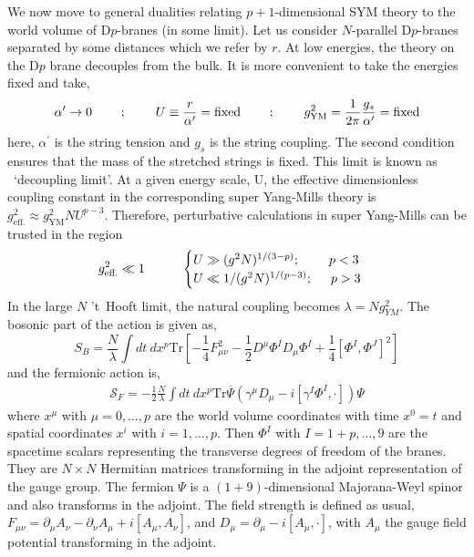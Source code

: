 We now move to general dualities relating $p+1$-dimensional SYM theory to the world volume of D$p$-branes
(in some limit). Let us consider $N$-parallel D$p$-branes separated by some distances which we 
refer by $r$. At low energies, the theory on the D$p$ brane decouples from the bulk. It is more convenient to
take the energies fixed and take, 
\[ \alpha^{\prime} \rightarrow 0  \hspace{8mm} ; \hspace{8mm} U \equiv \frac{r}{\alpha^{\prime}} = \text{fixed} \hspace{8mm}
; \hspace{8mm} g^{2}_{\text{YM}} = \frac{1}{2\pi} \frac{g_{s}}{\alpha^{\prime}} = \text{fixed}   \]
here, $\alpha^{\prime}$ is the string tension and $g_{s}$ is the string coupling. The 
second condition ensures that the mass of the stretched strings is fixed. This limit is known as ~`decoupling limit'.  
At a given energy scale, U, the effective dimensionless coupling constant in 
the corresponding super Yang-Mills theory is $ g_{\text{eff.}}^{2} \approx g_{\text{YM}}^{2} NU^{p-3}$. 
Therefore, perturbative calculations in super Yang-Mills can be trusted in the region 
\begin{equation}
 g_{\text{eff.}}^{2} \ll 1 \hspace{10mm} \begin{cases}
     U\gg (g^2 N)^{1/(3-p)} ; \hspace{8mm}p<3     \\
    U \ll 1/(g^2 N)^{1/(p-3)} ; \hspace{5mm} p>3  
      \end{cases}
    \end{equation} 
In the large $N$ 't~Hooft limit, the natural coupling becomes $ \lambda = N g_{YM}^{2}$. 
The bosonic part of the action is given as,
\begin{equation}
S_{B} = \frac{N}{\lambda}  \int dt ~ dx^p \mathrm{Tr}\left[  - \frac{1}{4} F_{\mu\nu}^2 - 
\frac{1}{2} D^\mu \Phi^I D_\mu \Phi^I + \frac{1}{4} \left[ \Phi^I , \Phi^J \right]^2  \right]
\end{equation}
and the fermionic action is,
\begin{eqnarray}
\mathcal{S}_{F} = -\frac{1}{2} \frac{N}{\lambda} \int dt ~ dx^p \mathrm{Tr} \overline{\Psi} \left( \gamma^\mu D_\mu - i  \left[ \gamma^I \Phi^I , \cdot \right] \right) \Psi
\end{eqnarray}
where $x^\mu$ with $\mu = 0, \ldots, p$ are the world volume coordinates 
with time $x^0 = t$ and 
spatial coordinates $x^i$ with $i=1,\ldots,p$. Then $\Phi^I$ with $I = 1+p, 
\ldots, 9$ are the spacetime 
scalars representing the transverse degrees of freedom of the branes. 
They are $N \times N$ Hermitian 
matrices transforming in the adjoint representation of the gauge group. 
The fermion $\Psi$ is a $(1+9)$-dimensional 
Majorana-Weyl spinor and also transforms in the adjoint. 
The field strength is defined as usual, $F_{\mu\nu} = \partial_\mu A_\nu - 
\partial_\nu A_\mu + i [ A_\mu , A_\nu ]$, and $D_\mu = \partial_\mu - i [ A_\mu, \cdot]$, with $A_\mu$ 
the gauge field potential transforming in the adjoint. 

